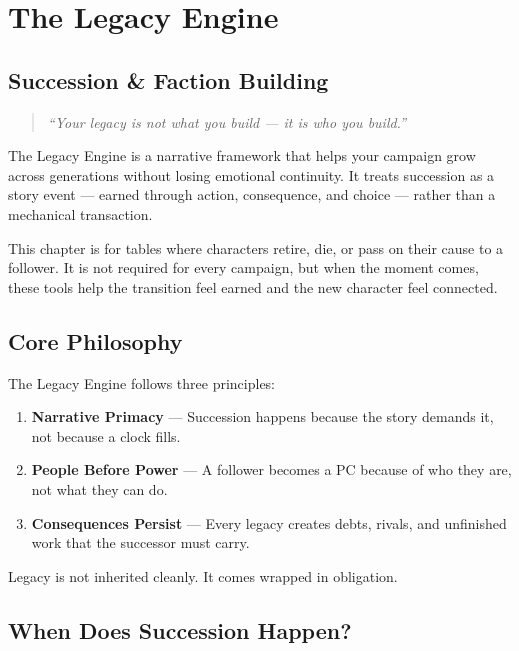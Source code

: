\chapter{The Legacy Engine}
\label{ch:legacy-engine}

\section*{Succession \& Faction Building}

\begin{quote}
\emph{“Your legacy is not what you build — it is who you build.”}
\end{quote}

The Legacy Engine is a narrative framework that helps your campaign grow across generations without losing emotional continuity. It treats succession as a story event — earned through action, consequence, and choice — rather than a mechanical transaction.

This chapter is for tables where characters retire, die, or pass on their cause to a follower. It is not required for every campaign, but when the moment comes, these tools help the transition feel earned and the new character feel connected.

\section{Core Philosophy}
\label{sec:legacy-philosophy}

The Legacy Engine follows three principles:

\begin{enumerate}
  \item \textbf{Narrative Primacy} — Succession happens because the story demands it, not because a clock fills.
  \item \textbf{People Before Power} — A follower becomes a PC because of who they are, not what they can do.
  \item \textbf{Consequences Persist} — Every legacy creates debts, rivals, and unfinished work that the successor must carry.
\end{enumerate}

Legacy is not inherited cleanly. It comes wrapped in obligation.

\section{When Does Succession Happen?}
\label{sec:succession-triggers}

